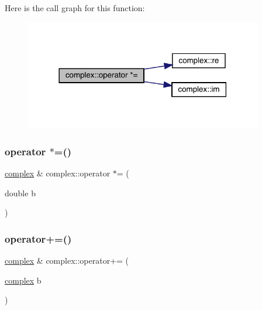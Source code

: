 Here is the call graph for this function\+:\nopagebreak
\begin{figure}[H]
\begin{center}
\leavevmode
\includegraphics[width=294pt]{classcomplex_a1916e5817cf8faf91347120309e99e59_cgraph}
\end{center}
\end{figure}
\mbox{\label{classcomplex_addc9b5f5da847cd8c3c0e72401ab6513}} 
\subsubsection{\texorpdfstring{operator $\ast$=()}{operator *=()}\hspace{0.1cm}{\footnotesize\ttfamily [2/2]}}
{\footnotesize\ttfamily \mbox{\hyperlink{classcomplex}{complex}} \& complex\+::operator $\ast$= (\begin{DoxyParamCaption}\item[{double}]{b }\end{DoxyParamCaption})}

\mbox{\label{classcomplex_a8430406d485ddd82907b89aa38dfac18}} 
\subsubsection{\texorpdfstring{operator+=()}{operator+=()}\hspace{0.1cm}{\footnotesize\ttfamily [1/2]}}
{\footnotesize\ttfamily \mbox{\hyperlink{classcomplex}{complex}} \& complex\+::operator+= (\begin{DoxyParamCaption}\item[{\mbox{\hyperlink{classcomplex}{complex}}}]{b }\end{DoxyParamCaption})}


